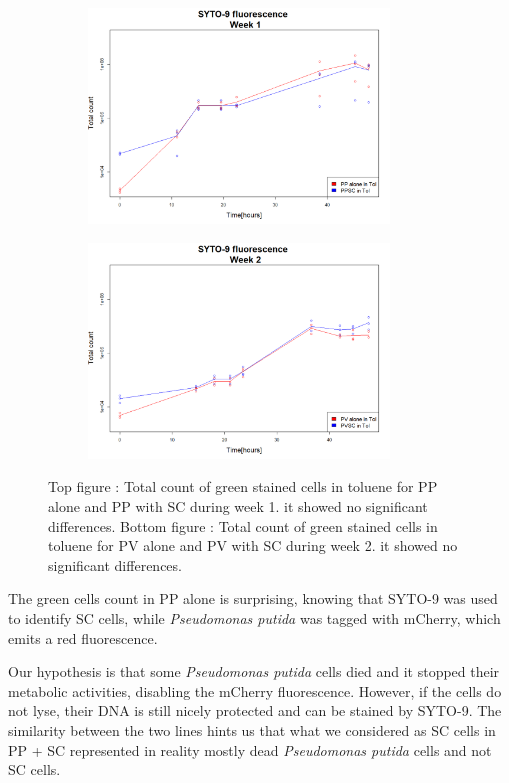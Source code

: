 \documentclass[a4paper, 10pt, conference]{ieeeconf}   %
\begin{document}
\begin{figure}
	 
	\begin{subfigure}{.5\textwidth}
		\centering
		\includegraphics[width=8cm]{problemw1.PNG}
		
		\label{problemw1}
	\end{subfigure}
	\begin{subfigure}{.5\textwidth}
		\centering
		\includegraphics[width=8cm]{problemw2.PNG}
		
		\label{problemw2}
	\end{subfigure}
\caption{Top figure : Total count of green stained cells in toluene for PP alone and PP with SC during week 1. it showed no significant differences. Bottom figure : Total count of green stained cells in toluene for PV alone and PV with SC during week 2. it showed no significant differences.}
\label{problemsyto}
  

\end{figure}
The green cells count in PP alone is surprising, knowing that SYTO-9 was used to identify SC cells, while \textit{Pseudomonas putida} was tagged with mCherry, which emits a red fluorescence.  

Our hypothesis is that some \textit{Pseudomonas putida} cells died and it stopped their metabolic activities, disabling the mCherry fluorescence. However, if the cells do not lyse, their DNA is still nicely protected and can be stained by SYTO-9. 
The similarity between the two lines hints us that what we considered as SC cells in PP + SC represented in reality mostly dead \textit{Pseudomonas putida} cells and not SC cells. 
\end{document}
